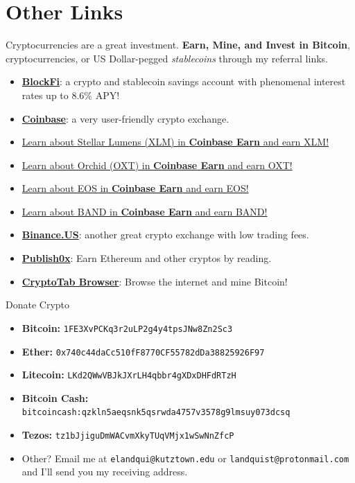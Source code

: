 \section*{Other Links}
\noindent Cryptocurrencies are a great investment. {\bf Earn, Mine, and Invest in Bitcoin}, cryptocurrencies, or US Dollar-pegged {\em stablecoins} through my referral links.
\begin{itemize}   
   \item \href{https://blockfi.mxuy67.net/c/2612759/889697/10568}{{\bf BlockFi}}: a crypto and stablecoin savings account with phenomenal interest rates up to 8.6\% APY! 
   \item \href{https://www.coinbase.com/join/landqu_e}{{\bf Coinbase}}: a very user-friendly crypto exchange.
   \item \href{https://coinbase.com/earn/xlm/invite/cq8rgxt4}{Learn about Stellar Lumens (XLM) in {\bf Coinbase Earn} and earn XLM!}
   \item \href{https://coinbase.com/earn/oxt/invite/39h7v158}{Learn about Orchid (OXT) in {\bf Coinbase Earn} and earn OXT!}
   \item \href{https://coinbase.com/earn/eos/invite/8b95vgnx}{Learn about EOS in {\bf Coinbase Earn} and earn EOS!}
   \item \href{https://coinbase.com/earn/band/invite/2s49zc65}{Learn about BAND in {\bf Coinbase Earn} and earn BAND!}
   \item \href{https://www.binance.us/?ref=35061022}{{\bf Binance.US}}: another great crypto exchange with low trading fees.
   \item \href{https://www.publish0x.com?a=Jxbo2qkAag}{{\bf Publish0x}}: Earn Ethereum and other cryptos by reading.
   \item \href{https://cryptotabbrowser.com/16356908}{{\bf CryptoTab Browser}}: Browse the internet and mine Bitcoin!
\end{itemize}

\noindent Donate Crypto
\begin{itemize}
    \item {\bf Bitcoin:} {\tt 1FE3XvPCKq3r2uLP2g4y4tpsJNw8Zn2Sc3}
    \item {\bf Ether:} {\tt 0x740c44daCc510fF8770CF55782dDa38825926F97}
    \item {\bf Litecoin:} {\tt LKd2QWwVBJkJXrLH4qbbr4gXDxDHFdRTzH}
    \item {\bf Bitcoin Cash:} {\tt bitcoincash:qzkln5aeqsnk5qsrwda4757v3578g9lmsuy073dcsq}
    \item {\bf Tezos:} {\tt tz1bJjiguDmWACvmXkyTUqVMjx1wSwNnZfcP}
    \item Other? Email me at {\tt elandqui@kutztown.edu} or {\tt landquist@protonmail.com} and I'll send you my receiving address.
\end{itemize}

